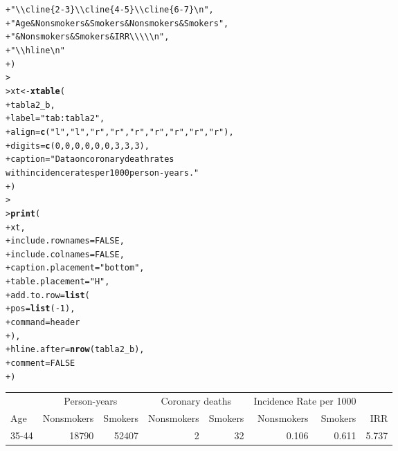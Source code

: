 \documentclass[10pt,a4paper,twoside]{article}\usepackage[]{graphicx}\usepackage[]{xcolor}
\makeatletter
\newcommand{\hlnum}[1]{\textcolor[rgb]{0.686,0.059,0.569}{#1}}%
\newcommand{\hlsng}[1]{\textcolor[rgb]{0.192,0.494,0.8}{#1}}%
\newcommand{\hlopt}[1]{\textcolor[rgb]{0,0,0}{#1}}%
\newcommand{\hldef}[1]{\textcolor[rgb]{0.345,0.345,0.345}{#1}}%
\newcommand{\hlkwb}[1]{\textcolor[rgb]{0.69,0.353,0.396}{#1}}%
\newcommand{\hlkwc}[1]{\textcolor[rgb]{0.333,0.667,0.333}{#1}}%
\newcommand{\hlkwd}[1]{\textcolor[rgb]{0.737,0.353,0.396}{\textbf{#1}}}%
\newenvironment{kframe}{%
 \def\at@end@of@kframe{}%
 \ifinner\ifhmode%
  \def\at@end@of@kframe{\end{minipage}}%
  \begin{minipage}{\columnwidth}%
 \fi\fi%
 \def\FrameCommand##1{\hskip\@totalleftmargin \hskip-\fboxsep
 \colorbox{shadecolor}{##1}\hskip-\fboxsep
     \hskip-\linewidth \hskip-\@totalleftmargin \hskip\columnwidth}%
 \MakeFramed {\advance\hsize-\width
   \@totalleftmargin\z@ \linewidth\hsize
   \@setminipage}}%
 {\par\unskip\endMakeFramed%
 \at@end@of@kframe}
\makeatother
\begin{document}
\begin{enumerate}
\begin{enumerate}[label=\alph*)]
\begin{kframe}
\begin{alltt}
\hldef{+ }  \hlsng{"\textbackslash{}\textbackslash{}cline\{2-3\} \textbackslash{}\textbackslash{}cline\{4-5\} \textbackslash{}\textbackslash{}cline\{6-7\}\textbackslash{}n"}\hldef{,}
\hldef{+ }  \hlsng{"Age & Nonsmokers & Smokers & Nonsmokers & Smokers"}\hldef{,}
\hldef{+ }  \hlsng{" & Nonsmokers & Smokers & IRR \textbackslash{}\textbackslash{}\textbackslash{}\textbackslash{}\textbackslash{}n"}\hldef{,}
\hldef{+ }  \hlsng{"\textbackslash{}\textbackslash{}hline\textbackslash{}n"}
\hldef{+ }\hldef{)}
\hldef{> }
\hldef{> }\hldef{xt} \hlkwb{<-} \hlkwd{xtable}\hldef{(}
\hldef{+ }  \hldef{tabla2_b,}
\hldef{+ }  \hlkwc{label} \hldef{=} \hlsng{"tab:tabla2"}\hldef{,}
\hldef{+ }  \hlkwc{align} \hldef{=} \hlkwd{c}\hldef{(}\hlsng{"l"}\hldef{,} \hlsng{"l"}\hldef{,} \hlsng{"r"}\hldef{,} \hlsng{"r"}\hldef{,} \hlsng{"r"}\hldef{,} \hlsng{"r"}\hldef{,} \hlsng{"r"}\hldef{,} \hlsng{"r"}\hldef{,} \hlsng{"r"}\hldef{),}
\hldef{+ }  \hlkwc{digits} \hldef{=} \hlkwd{c}\hldef{(}\hlnum{0}\hldef{,} \hlnum{0}\hldef{,} \hlnum{0}\hldef{,} \hlnum{0}\hldef{,} \hlnum{0}\hldef{,} \hlnum{0}\hldef{,} \hlnum{3}\hldef{,} \hlnum{3}\hldef{,} \hlnum{3}\hldef{),}
\hldef{+ }  \hlkwc{caption} \hldef{=} \hlsng{"Data on coronary death rates
  with incidence rates per 1000 person-years."}
\hldef{+ }\hldef{)}
\hldef{> }
\hldef{> }\hlkwd{print}\hldef{(}
\hldef{+ }  \hldef{xt,}
\hldef{+ }  \hlkwc{include.rownames} \hldef{=} \hlnum{FALSE}\hldef{,}
\hldef{+ }  \hlkwc{include.colnames} \hldef{=} \hlnum{FALSE}\hldef{,}
\hldef{+ }  \hlkwc{caption.placement} \hldef{=} \hlsng{"bottom"}\hldef{,}
\hldef{+ }  \hlkwc{table.placement} \hldef{=} \hlsng{"H"}\hldef{,}
\hldef{+ }  \hlkwc{add.to.row} \hldef{=} \hlkwd{list}\hldef{(}
\hldef{+ }    \hlkwc{pos} \hldef{=} \hlkwd{list}\hldef{(}\hlopt{-}\hlnum{1}\hldef{),}
\hldef{+ }    \hlkwc{command} \hldef{= header}
\hldef{+ }  \hldef{),}
\hldef{+ }  \hlkwc{hline.after} \hldef{=} \hlkwd{nrow}\hldef{(tabla2_b),}
\hldef{+ }  \hlkwc{comment} \hldef{=} \hlnum{FALSE}
\hldef{+ }\hldef{)}
\end{alltt}
\end{kframe}\begin{table}[H]
\centering
\begin{tabular}{lrrrrrrr}
   & \multicolumn{2}{c}{Person-years} & \multicolumn{2}{c}{Coronary deaths} & \multicolumn{2}{c}{Incidence Rate per 1000} \\
\cline{2-3} \cline{4-5} \cline{6-7}
Age & Nonsmokers & Smokers & Nonsmokers & Smokers & Nonsmokers & Smokers & IRR \\
\hline
 35-44 & 18790 & 52407 & 2 & 32 & 0.106 & 0.611 & 5.737 \\ 

\end{tabular}
\end{table}
\end{enumerate}
\end{enumerate}
\end{document}
